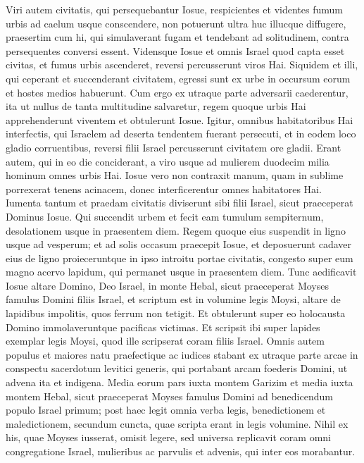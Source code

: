 \begin{biblechapter}
\begin{biblechapter}
\begin{biblechapter}
\begin{biblechapter}
\begin{biblechapter}
\begin{biblechapter}
\begin{biblechapter}
\begin{biblechapter}
\verse Viri autem civitatis, qui persequebantur Iosue, respicientes et videntes fumum urbis ad caelum usque conscendere, non potuerunt ultra huc illucque diffugere, praesertim cum hi, qui simulaverant fugam et tendebant ad solitudinem, contra persequentes conversi essent. 
\verse Vidensque Iosue et omnis Israel quod capta esset civitas, et fumus urbis ascenderet, reversi percusserunt viros Hai. 
\verse Siquidem et illi, qui ceperant et succenderant civitatem, egressi sunt ex urbe in occursum eorum et hostes medios habuerunt. Cum ergo ex utraque parte adversarii caederentur, ita ut nullus de tanta multitudine salvaretur, 
\verse regem quoque urbis Hai apprehenderunt viventem et obtulerunt Iosue.
 \verse Igitur, omnibus habitatoribus Hai interfectis, qui Israelem ad deserta tendentem fuerant persecuti, et in eodem loco gladio corruentibus, reversi filii Israel percusserunt civitatem ore gladii. 
\verse Erant autem, qui in eo die conciderant, a viro usque ad mulierem duodecim milia hominum omnes urbis Hai. 
 \verse Iosue vero non contraxit manum, quam in sublime porrexerat tenens acinacem, donec interficerentur omnes habitatores Hai. 
\verse Iumenta tantum et praedam civitatis diviserunt sibi filii Israel, sicut praeceperat Dominus Iosue. 
\verse Qui succendit urbem et fecit eam tumulum sempiternum, desolationem usque in praesentem diem. 
\verse Regem quoque eius suspendit in ligno usque ad vesperum; et ad solis occasum praecepit Iosue, et deposuerunt cadaver eius de ligno proieceruntque in ipso introitu portae civitatis, congesto super eum magno acervo lapidum, qui permanet usque in praesentem diem.
 \verse Tunc aedificavit Iosue altare Domino, Deo Israel, in monte Hebal, 
\verse sicut praeceperat Moyses famulus Domini filiis Israel, et scriptum est in volumine legis Moysi, altare de lapidibus impolitis, quos ferrum non tetigit. Et obtulerunt super eo holocausta Domino immolaveruntque pacificas victimas. 
\verse Et scripsit ibi super lapides exemplar legis Moysi, quod ille scripserat coram filiis Israel.
 \verse Omnis autem populus et maiores natu praefectique ac iudices stabant ex utraque parte arcae in conspectu sacerdotum levitici generis, qui portabant arcam foederis Domini, ut advena ita et indigena. Media eorum pars iuxta montem Garizim et media iuxta montem Hebal, sicut praeceperat Moyses famulus Domini ad benedicendum populo Israel primum; 
\verse post haec legit omnia verba legis, benedictionem et maledictionem, secundum cuncta, quae scripta erant in legis volumine. 
\verse Nihil ex his, quae Moyses iusserat, omisit legere, sed universa replicavit coram omni congregatione Israel, mulieribus ac parvulis et advenis, qui inter eos morabantur.
 

\end{biblechapter}
\end{biblechapter}
\end{biblechapter}
\end{biblechapter}
\end{biblechapter}
\end{biblechapter}
\end{biblechapter}
\end{biblechapter}
